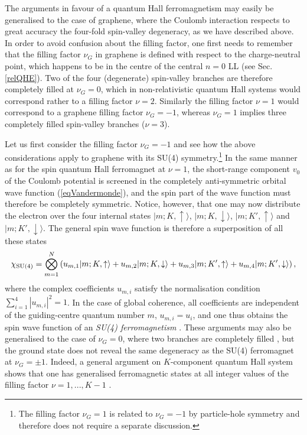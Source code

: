 \documentclass[10pt]{book}
\newcommand{\ua}{\uparrow}
\newcommand{\da}{\downarrow}
\newcommand{\beq}{\begin{equation}}
\newcommand{\eeq}{\end{equation}}
\begin{document}
The arguments in favour of a quantum Hall ferromagnetism may easily be generalised to the case of graphene, where
the Coulomb interaction respects to great accuracy the four-fold spin-valley degeneracy, as we have described above.
In order to avoid confusion about the filling factor, one first needs to remember that the filling factor 
$\nu_G$ in graphene
is defined with respect to the charge-neutral point, which happens to be in the centre of the central $n=0$ LL
(see Sec. \ref{relQHE}). Two of the four (degenerate) spin-valley branches are therefore completely filled at $\nu_G=0$,
which in non-relativistic quantum Hall systems would correspond rather to a filling factor $\nu=2$. Similarly the
filling factor $\nu=1$ would correspond to a graphene filling factor $\nu_G=-1$, whereas $\nu_G=1$ implies three
completely filled spin-valley branches ($\nu=3$). 

Let us first consider the filling factor $\nu_G=-1$ and see
how the above considerations apply to graphene with its SU(4) symmetry.\footnote{The filling factor $\nu_G=1$ is related
to $\nu_G=-1$ by particle-hole symmetry and therefore does not require a separate discussion.}
In the same manner as for the spin quantum Hall ferromagnet at $\nu=1$, the short-range component $v_0$ of the Coulomb potential
is screened in the completely anti-symmetric orbital wave function (\ref{eqVandermonde}), and the spin part of the wave
function must therefore be completely symmetric. Notice, however, that one may now distribute the electron over the 
four internal states ${|m;K,\ua\rangle}$, $|m;K,\da\rangle$, $|m;K',\ua\rangle$ and $|m;K',\da\rangle$. 
The general spin wave function is therefore a superposition of all these states
\beq\label{SU4spinWF}
\chi_{\rm SU(4)}=\bigotimes_{m=1}^{N}\left(u_{m,1}|m;K,\ua\rangle + u_{m,2}|m;K,\da\rangle + u_{m,3}|m;K',\ua\rangle + u_{m,4}|m;K',\da\rangle \right),
\eeq
where the complex coefficients $u_{m,i}$ satisfy the normalisation condition $\sum_{i=1}^4|u_{m,i}|^2=1$. In the case
of global coherence, all coefficients are independent of the guiding-centre quantum number $m$, $u_{m,i}=u_i$,
and one thus obtains the spin wave function of an {\sl SU(4) ferromagnetism} \cite{nomura,GMD,alicea,yang}. 
These arguments may also be generalised
to the case of $\nu_G=0$, where two branches are completely filled \cite{yang}, but the ground state does not reveal the same
degeneracy as the SU(4) ferromagnet at $\nu_{G}=\pm 1$.
Indeed, a general argument on $K$-component quantum Hall system
shows that one has generalised ferromagnetic states at all integer values of the filling factor $\nu=1, ...,K-1$
\cite{arovas}.
\end{document}
